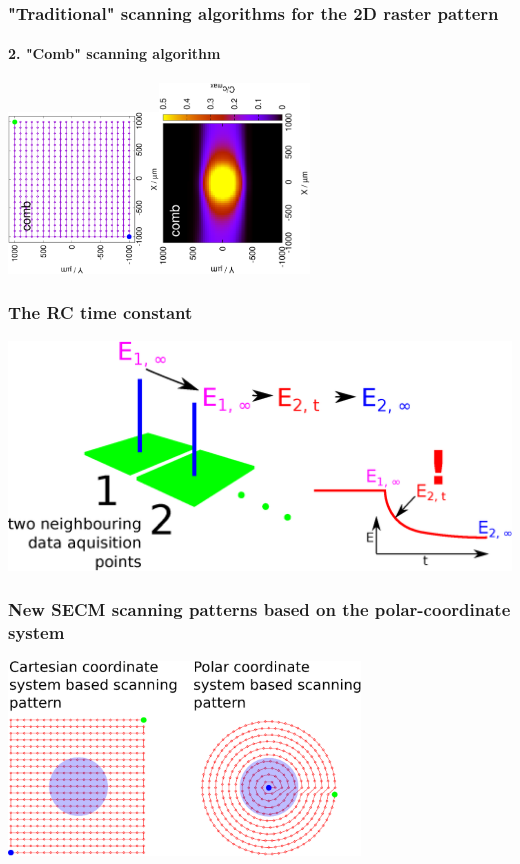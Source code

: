 \documentclass{beamer}
\begin{document}
\begin{frame}
	\frametitle{"Traditional" scanning algorithms for the 2D raster pattern}
	\framesubtitle{2. "Comb" scanning algorithm}
	\includegraphics[width=0.3\textwidth, angle=-90]{comb_pattern.eps}\includegraphics[width=0.3\textwidth, angle=-90]{comb_sim.eps}
	\vfill
\end{frame}



\begin{frame}
	\frametitle{The RC time constant} 
	\centering
	\includegraphics[width=1\textwidth]{t.eps}
\end{frame}



\begin{frame}
	\frametitle{New SECM scanning patterns based on the polar-coordinate system}
	\centering	
	\includegraphics[width=0.7\textwidth]{cartesian_vs_polar.eps}
	
	\vfill
\end{frame}
\end{document}
